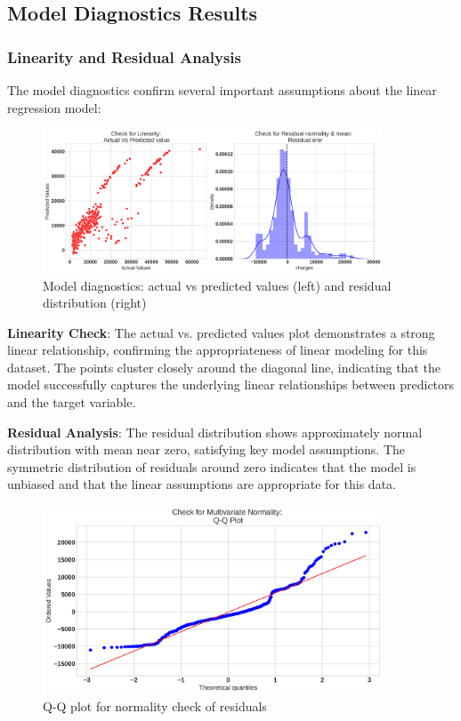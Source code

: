 \documentclass[12pt,a4paper]{article}
\begin{document}
\subsection{Model Diagnostics Results}

\subsubsection{Linearity and Residual Analysis}
The model diagnostics confirm several important assumptions about the linear regression model:

\begin{figure}[H]
\centering
\includegraphics[width=0.9\textwidth]{linearity_check_plots.png}
\caption{Model diagnostics: actual vs predicted values (left) and residual distribution (right)}
\label{fig:linearity_check_plots}
\end{figure}

\textbf{Linearity Check}: The actual vs. predicted values plot demonstrates a strong linear relationship, confirming the appropriateness of linear modeling for this dataset. The points cluster closely around the diagonal line, indicating that the model successfully captures the underlying linear relationships between predictors and the target variable.

\textbf{Residual Analysis}: The residual distribution shows approximately normal distribution with mean near zero, satisfying key model assumptions. The symmetric distribution of residuals around zero indicates that the model is unbiased and that the linear assumptions are appropriate for this data.

\begin{figure}[H]
\centering
\includegraphics[width=0.9\textwidth]{qq_plot_check.png}
\caption{Q-Q plot for normality check of residuals}
\label{fig:qq_plot_homoscedasticity_check}
\end{figure}
\end{document}
